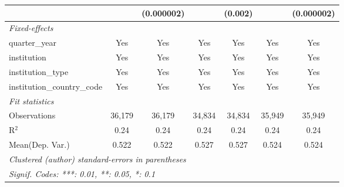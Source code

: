 \begin{tabular}{lcccccc}
                                      &              & (0.000002)    &               & (0.002)       &              & (0.000002)\\   
   \midrule
   \emph{Fixed-effects}\\
   quarter\_year                      & Yes          & Yes           & Yes           & Yes           & Yes          & Yes\\  
   institution                        & Yes          & Yes           & Yes           & Yes           & Yes          & Yes\\  
   institution\_type                  & Yes          & Yes           & Yes           & Yes           & Yes          & Yes\\  
   institution\_country\_code         & Yes          & Yes           & Yes           & Yes           & Yes          & Yes\\  
   \midrule
   \emph{Fit statistics}\\
   Observations                       & 36,179       & 36,179        & 34,834        & 34,834        & 35,949       & 35,949\\  
   R$^2$                              & 0.24         & 0.24          & 0.24          & 0.24          & 0.24         & 0.24\\  
Mean(Dep. Var.) & 0.522 & 0.522 & 0.527 & 0.527 & 0.524 & 0.524 \\
   \midrule \midrule
   \multicolumn{7}{l}{\emph{Clustered (author) standard-errors in parentheses}}\\
   \multicolumn{7}{l}{\emph{Signif. Codes: ***: 0.01, **: 0.05, *: 0.1}}\\
\end{tabular}
\par\endgroup
